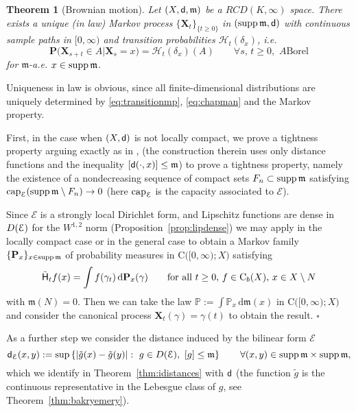 \documentclass[reqno,11pt]{article}
\numberwithin{equation}{section}
\newcommand{\mm}{{\mbox{\boldmath$m$}}}
\newcommand{\sfd}{{\sf d}}
\newcommand{\supp}{\mathop{\rm supp}\nolimits}   %
\renewcommand{\d}{{\mathrm d}}
\newenvironment{proof}{\removelastskip\par\medskip   %
\noindent{\em Proof.}
\rm}{\penalty-20\null\hfill$\square$\par\medbreak}
\newtheorem{theorem}{Theorem}[section]
\newcommand{\rcd}[2]{RCD(#1,#2)}
\newcommand{\heatl}{{\sf H}}
\newcommand{\heatw}{{\mathscr H}}
\newcommand{\ke}[2]{\heatw_{#2}(\delta_{#1})}
\newcommand{\Cb}{\mathrm C_b}
\renewcommand{\mm}{\mathfrak m}
\begin{document}
\begin{theorem}[Brownian motion]\label{thm:brownian}
Let $(X,\sfd,\mm)$ be a $\rcd K\infty$ space. There exists a unique
(in law) Markov process $\{{\mathbf X}_t\}_{\{t\geq 0\}}$ in
$(\supp\mm,\sfd)$ with continuous sample paths in $[0,\infty)$ and
transition probabilities $\heatw_t(\delta_x)$, i.e.
\begin{equation}\label{eq:transitionmp}
{\mathbf P}\bigl({\mathbf X}_{s+t}\in A\bigl|{\mathbf
X}_s=x\bigr)=\ke xt(A) \qquad\forall s,\,t\geq 0,\,\,\text{$A$
Borel}
\end{equation}
for $\mm$-a.e. $x\in\supp\mm$.
\end{theorem}
\begin{proof} Uniqueness in law is obvious, since all
finite-dimensional distributions are uniquely determined by
\eqref{eq:transitionmp}, \eqref{eq:chapman} and the Markov property.

First, in the case when $(X,\sfd)$ is not locally compact, we prove
a tightness property arguing exactly as in
\cite[Theorem~1.2]{Ambrosio-Savare-Zambotti09},
\cite[Proposition~IV.4.2]{Rockner92} (the construction therein uses
only distance functions and the inequality $[\sfd(\cdot,x)]\leq\mm$)
to prove a tightness property, namely the existence of a
nondecreasing sequence of compact sets $F_n\subset\supp\mm$
satisfying ${\rm cap}_{{\mathcal E}}(\supp\mm\setminus F_n)\to 0$
(here ${\rm cap}_{{\mathcal E}}$ is the capacity associated to
${\mathcal E}$).

Since ${\mathcal E}$ is a strongly local Dirichlet form, and
Lipschitz functions are dense in $D({\cal E})$ for the $W^{1,2}$
norm (Proposition~\ref{prop:lipdense}) we may apply
\cite[Theorem~4.5.3]{Fukushima80} in the locally compact case or
\cite[Theorem~IV.3.5, Theorem~V.1.5]{Rockner92} in the general case
to obtain a Markov family $\{{\mathbf P}_x\}_{x\in\supp\mm}$ of
probability measures in $\mathrm C\bigl([0,\infty);X\bigr)$
satisfying
$$
\tilde\heatl_t f(x)=\int f(\gamma_t)\,\d{\mathbf
P}_x(\gamma)\qquad\text{for all $t\geq 0$, $f\in\Cb(X)$, $x\in
X\setminus N$}
$$
with $\mm(N)=0$. Then we can take the law ${\mathbb P}:=\int
{\mathbb P}_x\,\d\mm(x)$ in $\mathrm C\bigl([0,\infty);X\bigr)$ and
consider the canonical process ${\mathbf X}_t(\gamma)=\gamma(t)$ to
obtain the result.
\end{proof}

As a further step we consider the distance induced by the bilinear
form $\mathcal E$
\begin{equation}\label{eq:fuku2}
\sfd_{{\mathcal E}}(x,y):=\sup\left\{|\tilde g(x)-\tilde g(y)|:\
g\in D({\mathcal E}),\,\,[g]\leq\mm\right\}\qquad\forall (x,y)\in
\supp\mm\times\supp\mm,
\end{equation}
which we identify in Theorem~\ref{thm:idistances} with $\sfd$ (the
function $\tilde{g}$ is the continuous representative in the
Lebesgue class of $g$, see Theorem~\ref{thm:bakryemery}).
\end{document}
